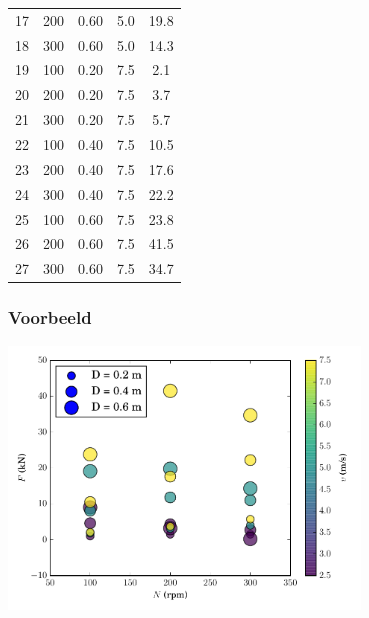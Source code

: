 \documentclass[t]{beamer}
\begin{document}
\begin{frame}
\begin{tabular}{lcccc}
	        17 & 200 & 0.60 & 5.0 & 19.8 \\     
	        18 & 300 & 0.60 & 5.0 & 14.3 \\     
	        19 & 100 & 0.20 & 7.5 & 2.1 \\      
	        20 & 200 & 0.20 & 7.5 & 3.7 \\      
	        21 & 300 & 0.20 & 7.5 & 5.7 \\      
	        22 & 100 & 0.40 & 7.5 & 10.5 \\     
	        23 & 200 & 0.40 & 7.5 & 17.6 \\     
	        24 & 300 & 0.40 & 7.5 & 22.2 \\     
	        25 & 100 & 0.60 & 7.5 & 23.8 \\     
	        26 & 200 & 0.60 & 7.5 & 41.5 \\     
	        27 & 300 & 0.60 & 7.5 & 34.7 \\                                 
			\hline
		\end{tabular}
	\end{frame}
	\begin{frame}
		\frametitle{Voorbeeld}
		\center
        \includegraphics[height=7cm]{fig/gelijkvormigheid/Dimensieanalyse_voorbeeld_data}
	\end{frame}
\end{document}
